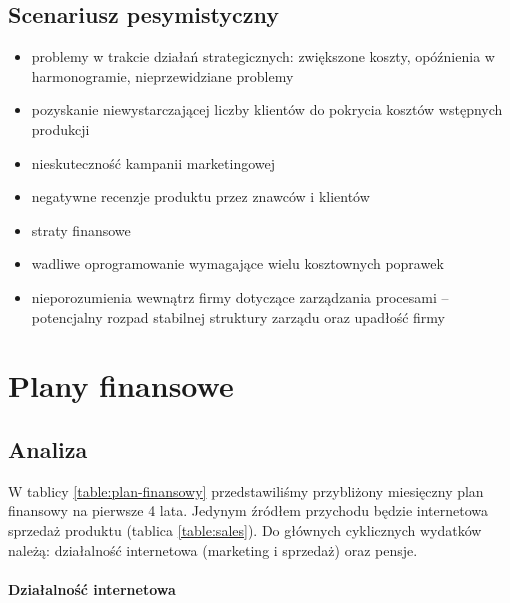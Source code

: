 \documentclass[12pt]{article}
\begin{document}
\subsection{Scenariusz pesymistyczny}

\begin{itemize}
    \item problemy w trakcie działań strategicznych: zwiększone koszty, opóźnienia w harmonogramie, nieprzewidziane problemy
    \item pozyskanie niewystarczającej liczby klientów do pokrycia kosztów wstępnych produkcji
    \item nieskuteczność kampanii marketingowej
    \item negatywne recenzje produktu przez znawców i klientów
    \item straty finansowe
    \item wadliwe oprogramowanie wymagające wielu kosztownych poprawek
    \item nieporozumienia wewnątrz firmy dotyczące zarządzania procesami -- potencjalny rozpad stabilnej struktury zarządu oraz upadłość firmy
\end{itemize}

\section{Plany finansowe}



\subsection{Analiza}

W tablicy \ref{table:plan-finansowy} przedstawiliśmy przybliżony miesięczny plan finansowy na pierwsze 4 lata.
Jedynym źródłem przychodu będzie internetowa sprzedaż produktu (tablica \ref{table:sales}).
Do głównych cyklicznych wydatków należą: działalność internetowa (marketing i sprzedaż) oraz pensje.

\paragraph{Działalność internetowa}
\end{document}
